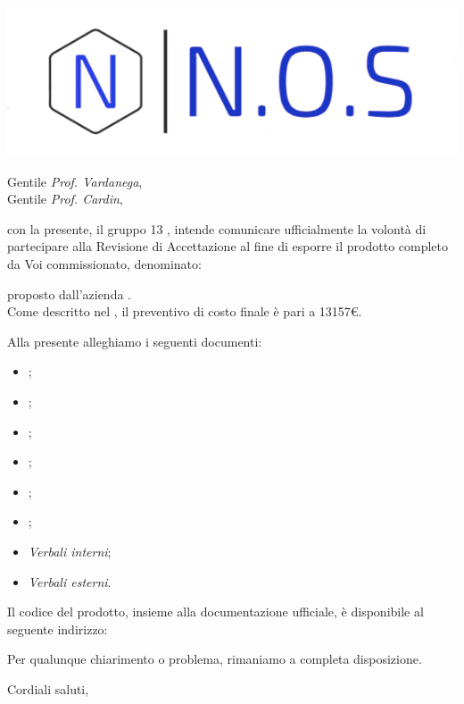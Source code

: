 \documentclass[12pt]{letter}
\date{19 maggio 2021}
\begin{document}
\begin{letter}{ }

\includegraphics[scale=1.5
]{../../../Immagini/N.O.S.jpg}

\opening{Gentile \textit{Prof. Vardanega},\\ Gentile \textit{Prof. Cardin},}

con la presente, il gruppo 13 {\Gruppo}, intende comunicare ufficialmente la volontà di partecipare alla Revisione di Accettazione al fine di esporre il prodotto completo da Voi commissionato, denominato:
\begin{center}
	\textbf{\NomeProgetto}
\end{center}
proposto dall'azienda \Proponente.\\
Come descritto nel , il preventivo di costo finale è pari a 13157\euro. 

Alla presente alleghiamo i seguenti documenti:

\begin{itemize}
	\item {};
	\item {};
	\item {};
	\item {};
	\item {};
	\item {};
	\item \textit{Verbali interni};
	\item \textit{Verbali esterni}.
\end{itemize}

Il codice del prodotto, insieme alla documentazione ufficiale, è disponibile al seguente indirizzo: \\


Per qualunque chiarimento o problema, rimaniamo a completa disposizione.
\closing{Cordiali saluti, }

\vspace{2em}

\end{letter}
\end{document}

